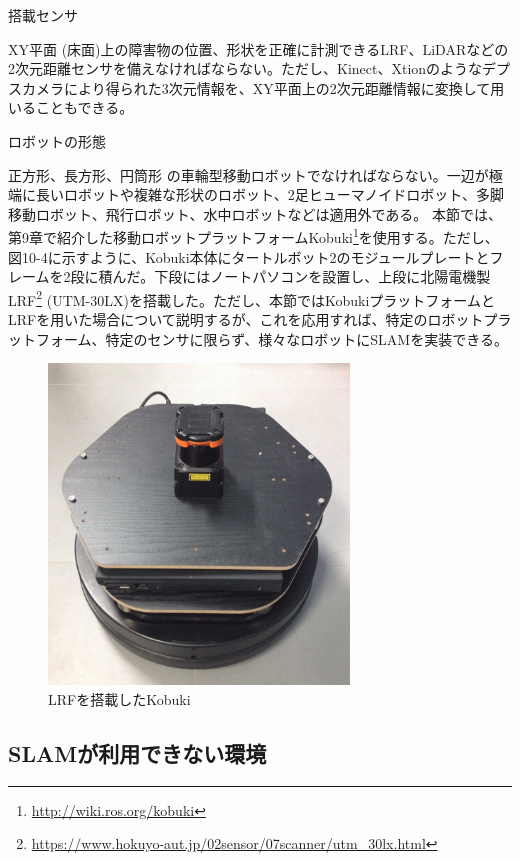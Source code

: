\circled{\thenum} 搭載センサ

XY平面 (床面)上の障害物の位置、形状を正確に計測できるLRF、LiDARなどの2次元距離センサを備えなければならない。ただし、Kinect、Xtionのようなデプスカメラにより得られた3次元情報を、XY平面上の2次元距離情報に変換して用いることもできる。

\circled{\thenum} ロボットの形態

正方形、長方形、円筒形 の車輪型移動ロボットでなければならない。一辺が極端に長いロボットや複雑な形状のロボット、2足ヒューマノイドロボット、多脚移動ロボット、飛行ロボット、水中ロボットなどは適用外である。
本節では、第9章で紹介した移動ロボットプラットフォームKobuki\footnote{\url{http://wiki.ros.org/kobuki}}を使用する。ただし、図10-4に示すように、Kobuki本体にタートルボット2のモジュールプレートとフレームを2段に積んだ。下段にはノートパソコンを設置し、上段に北陽電機製 LRF\footnote{\url{https://www.hokuyo-aut.jp/02sensor/07scanner/utm\_30lx.html}}  (UTM-30LX)を搭載した。ただし、本節ではKobukiプラットフォームとLRFを用いた場合について説明するが、これを応用すれば、特定のロボットプラットフォーム、特定のセンサに限らず、様々なロボットにSLAMを実装できる。

\begin{figure}[htp]
  \centering
  \includegraphics[width=8cm]{pictures/chapter10/pic_10_04.png}
  \caption{LRFを搭載したKobuki}
\end{figure}

\subsection{SLAMが利用できない環境}

